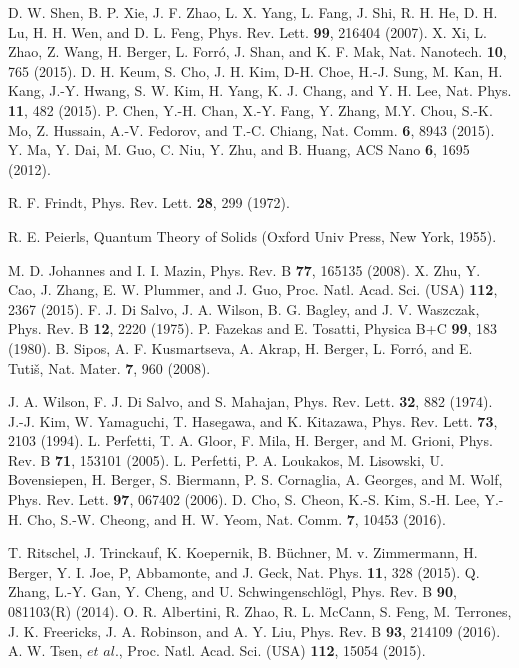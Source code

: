 \documentclass[aps,prl,twocolumn,showpacs,byrevtex]{revtex4}
\begin{document}
\begin{thebibliography}{99}

 D. W. Shen, B. P. Xie, J. F. Zhao, L. X. Yang, L. Fang, J. Shi, R. H. He, D. H. Lu, H. H. Wen, and D. L. Feng, Phys. Rev. Lett. {\bf 99}, 216404 (2007).
 X. Xi, L. Zhao, Z. Wang, H. Berger, L. Forr\'o, J. Shan, and K. F. Mak, Nat. Nanotech. {\bf 10}, 765 (2015).
 D. H. Keum, S. Cho, J. H. Kim, D-H. Choe, H.-J. Sung, M. Kan, H. Kang, J.-Y. Hwang, S. W. Kim, H. Yang, K. J. Chang, and Y. H. Lee, Nat. Phys. {\bf 11}, 482 (2015).
 P. Chen, Y.-H. Chan, X.-Y. Fang, Y. Zhang, M.Y. Chou, S.-K. Mo, Z. Hussain, A.-V. Fedorov, and T.-C. Chiang, Nat. Comm. {\bf 6}, 8943 (2015).
 Y. Ma, Y. Dai, M. Guo, C. Niu, Y. Zhu, and B. Huang, ACS Nano {\bf 6}, 1695 (2012).

 R. F. Frindt, Phys. Rev. Lett. {\bf 28}, 299 (1972).

 R. E. Peierls, Quantum Theory of Solids (Oxford Univ Press, New York, 1955).


 M. D. Johannes and I. I. Mazin, Phys. Rev. B {\bf 77}, 165135 (2008).
 X. Zhu, Y. Cao, J. Zhang, E. W. Plummer, and J. Guo, Proc. Natl. Acad. Sci. (USA) {\bf 112}, 2367 (2015).
 F. J. Di Salvo, J. A. Wilson, B. G. Bagley, and J. V. Waszczak, Phys. Rev. B {\bf 12}, 2220 (1975).
 P. Fazekas and E. Tosatti, Physica B+C {\bf 99}, 183 (1980).
 B. Sipos, A. F. Kusmartseva, A. Akrap, H. Berger, L. Forr\'o, and E. Tuti\v{s}, Nat. Mater. {\bf 7}, 960 (2008).

 J. A. Wilson, F. J. Di Salvo, and S. Mahajan, Phys. Rev. Lett. {\bf 32}, 882 (1974).
 J.-J. Kim, W. Yamaguchi, T. Hasegawa, and K. Kitazawa, Phys. Rev. Lett. {\bf 73}, 2103 (1994).
 L. Perfetti, T. A. Gloor, F. Mila, H. Berger, and M. Grioni, Phys. Rev. B {\bf 71}, 153101 (2005).
 L. Perfetti, P. A. Loukakos, M. Lisowski, U. Bovensiepen, H. Berger, S. Biermann, P. S. Cornaglia, A. Georges, and M. Wolf, Phys. Rev. Lett. {\bf 97}, 067402 (2006).
 D. Cho, S. Cheon, K.-S. Kim, S.-H. Lee, Y.-H. Cho, S.-W. Cheong, and H. W. Yeom, Nat. Comm. {\bf 7}, 10453 (2016).

 T. Ritschel, J. Trinckauf, K. Koepernik, B. B\"uchner, M. v. Zimmermann, H. Berger, Y. I. Joe, P, Abbamonte, and J. Geck, Nat. Phys. {\bf 11}, 328 (2015).
 Q. Zhang, L.-Y. Gan, Y. Cheng, and U. Schwingenschl\"ogl, Phys. Rev. B {\bf 90}, 081103(R) (2014).
 O. R. Albertini, R. Zhao, R. L. McCann, S. Feng, M. Terrones, J. K. Freericks, J. A. Robinson, and A. Y. Liu, Phys. Rev. B {\bf 93}, 214109 (2016).
 A. W. Tsen, $et$ $al.$, Proc. Natl. Acad. Sci. (USA) {\bf 112}, 15054 (2015).


\end{thebibliography}
\end{document}
